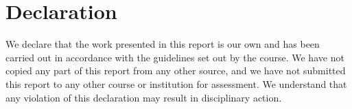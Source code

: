 \section*{Declaration}
We declare that the work presented in this report is our own and has been carried out in accordance
with the guidelines set out by the course. 
We have not copied any part of this report from any other source, and we have not submitted this report to any other course or institution for assessment. 
We understand that any violation of this declaration may result in disciplinary action.